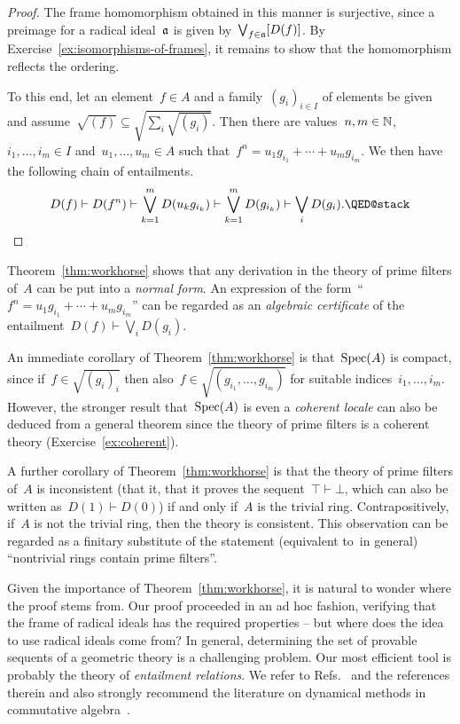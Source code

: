\documentclass{ws-rv9x6}
\begin{document}
{\begin{proof}
The frame homomorphism obtained in this manner is surjective, since a preimage
for a radical ideal~$\mathfrak{a}$ is given by~$\bigvee_{f \in \mathfrak{a}} [D(f)]$. By
Exercise~\ref{ex:isomorphisms-of-frames}, it
remains to show that the homomorphism reflects the ordering.

To this end, let an element~$f \in A$ and a family~$(g_i)_{i \in I}$ of elements be
given and assume~$\sqrt{(f)} \subseteq \sqrt{\sum_i \sqrt{(g_i)}}$. Then there
are values~$n,m \in \mathbb{N}$, $i_1,\ldots,i_m \in I$ and~$u_1,\ldots,u_m \in
A$ such that~$f^n = u_1 g_{i_1} + \cdots + u_m g_{i_m}$. We then have the
following chain of entailments.
\[
  D(f) \vdash
  D(f^n) \vdash
  \bigvee_{k=1}^m D(u_k g_{i_k}) \vdash
  \bigvee_{k=1}^m D(g_{i_k}) \vdash
  \bigvee_i D(g_i). \qedhere
\]
\end{proof}

Theorem~\ref{thm:workhorse} shows that any derivation in the theory of prime
filters of~$A$ can be put into a \emph{normal form}. An expression of the
form~``$f^n = u_1 g_{i_1} + \cdots + u_m g_{i_m}$'' can be regarded as an
\emph{algebraic certificate} of the entailment~$D(f) \vdash \bigvee_i D(g_i)$.

\begin{remark}An immediate corollary of Theorem~\ref{thm:workhorse} is
that~$\mathrm{Spec}(A)$ is compact, since if~$f \in \sqrt{(g_i)_i}$ then also~$f \in
\sqrt{(g_{i_1},\ldots,g_{i_m})}$ for suitable indices~$i_1,\ldots,i_m$.
However, the stronger result that~$\mathrm{Spec}(A)$ is
even a \emph{coherent locale} can also be deduced from a general theorem
since the theory of prime filters is a coherent theory
(Exercise~\ref{ex:coherent}).\end{remark}

\begin{remark}\label{rem:consistency}
A further corollary of Theorem~\ref{thm:workhorse} is that the theory of prime
filters of~$A$ is inconsistent (that it, that it proves the sequent~$\top
\vdash \bot$, which can also be written as~$D(1) \vdash D(0)$) if and only
if~$A$ is the trivial ring. Contrapositively, if~$A$ is not the trivial ring,
then the theory is consistent. This observation can be regarded as a finitary
substitute of the statement (equivalent to~\BPIT in general) ``nontrivial rings contain prime filters''.
\end{remark}

\begin{remark}Given the importance of Theorem~\ref{thm:workhorse}, it is
natural to wonder where the proof stems from. Our proof proceeded in an ad hoc
fashion, verifying that the frame of radical ideals has the required properties
-- but where does the idea to use radical ideals come from? In general, determining the set
of provable sequents of a geometric theory is a challenging problem. Our most
efficient tool is probably the theory of \emph{entailment relations}. We refer
to Refs.~ and
the references therein and also strongly recommend the literature on dynamical
methods in commutative
algebra~.
\end{remark}

}
\end{document}
